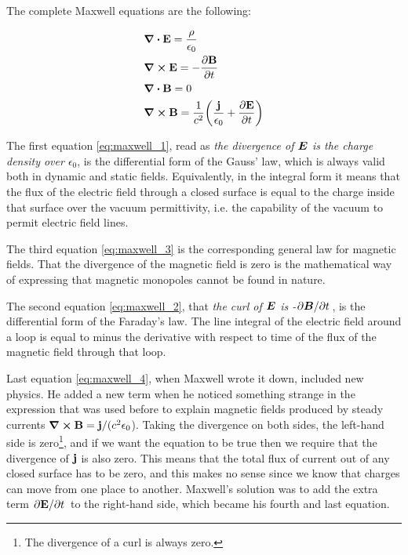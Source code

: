 \documentclass[11pt,a4paper]{article}
\begin{document}
The complete Maxwell equations are the following:

\begin{subequations}\label{eq:maxwell_equations}
\begin{align}
&\div\vb{E}=\frac{\rho}{\epsilon_0}\label{eq:maxwell_1}\\
&\curl\vb{E}=-\pdv{\vb{B}}{t}\label{eq:maxwell_2}\\
&\div\vb{B}=0\label{eq:maxwell_3}\\
&\curl\vb{B}=\frac{1}{c^2}\qty(\frac{\vb{j}}{\epsilon_0}+\pdv{\vb{E}}{t})\label{eq:maxwell_4}
\end{align}
\end{subequations}

The first equation \eqref{eq:maxwell_1}, read as \emph{the divergence of $\vb*{E}$ is the charge density over $\epsilon_0$}, is the differential form of the Gauss' law, which is always valid both in dynamic and static fields. Equivalently, in the integral form it means that the flux of the electric field through a closed surface is equal to the charge inside that surface over the vacuum permittivity, i.e. the capability of the vacuum to permit electric field lines.

The third equation \eqref{eq:maxwell_3} is the corresponding general law for magnetic fields. That the divergence of the magnetic field is zero is the mathematical way of expressing that magnetic monopoles cannot be found in nature.

The second equation \eqref{eq:maxwell_2}, that \emph{the curl of $\vb*{E}$ is -$\pdv*{\vb*{B}}{t}$}, is the differential form of the Faraday's law. The line integral of the electric field around a loop is equal to minus the derivative with respect to time of the flux of the magnetic field through that loop.

Last equation \eqref{eq:maxwell_4}, when Maxwell wrote it down, included new physics. He added a new term when he noticed something strange in the expression that was used before to explain magnetic fields produced by steady currents $\curl\vb{B}=\vb{j}/(c^2\epsilon_0$). Taking the divergence on both sides, the left-hand side is zero\footnote{The divergence of a curl is always zero.}, and if we want the equation to be true then we require that the divergence of $\vb{j}$ is also zero. This means that the total flux of current out of any closed surface has to be zero, and this makes no sense since we know that charges can move from one place to another. Maxwell's solution was to add the extra term $\pdv*{\vb{E}}{t}$ to the right-hand side, which became his fourth and last equation.
\end{document}

